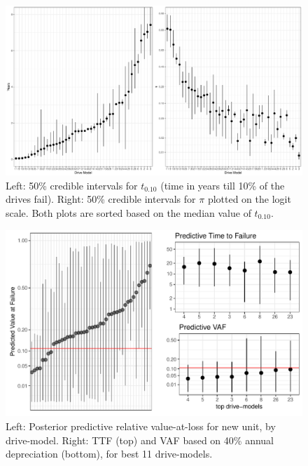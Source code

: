 \documentclass[12pt]{article}
\begin{document}
\begin{figure}[H]
  \centering
  \includegraphics[width=\textwidth]{b10andpi}
  \caption{Left: 50\% credible intervals for  $t_{0.10}$ (time in years till 10\% of the drives fail). Right: 50\% credible intervals for $\pi$ plotted on the logit scale.  Both plots are sorted based on the median value of $t_{0.10}$.}
  \label{fig4}
\end{figure}

\begin{figure}[H]
  \centering
  \includegraphics[width=.8\textwidth]{dm-eval}
  \caption{Left: Posterior predictive relative value-at-loss for new
    unit, by drive-model. Right: TTF (top) and VAF based on 40\% annual depreciation (bottom), for best 11 drive-models.}
  \label{fig5}
\end{figure}
\end{document}
